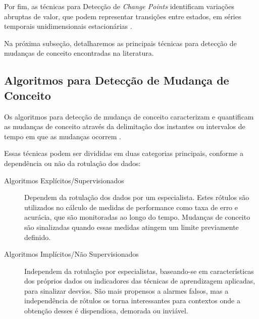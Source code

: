 \documentclass[qual, classic, a4paper]{ufbathesis}
\begin{document}

Por fim, as técnicas para Detecção de \textit{Change Points} identificam variações abruptas de valor, que podem representar transições entre estados, em séries temporais unidimensionais estacionárias \cite{Aminikhanghahi:2017:SMT:3086013.3086037}.

Na próxima subseção, detalharemos as principais técnicas para detecção de mudanças de conceito encontradas na literatura.

\subsection{Algoritmos para Detecção de Mudança de Conceito}

Os algoritmos para detecção de mudança de conceito caracterizam e quantificam as mudanças de conceito através da delimitação dos instantes ou intervalos de tempo em que as mudanças ocorrem \cite{Basseville:1993:DAC:151741}.

Essas técnicas podem ser divididas em duas categorias principais, conforme a dependência ou não da rotulação dos dados:
\begin{description}
    \item[Algoritmos Explícitos/Supervisionados] Dependem da rotulação dos dados por um especialista.
    Estes rótulos são utilizados no cálculo de medidas de performance como taxa de erro e acurácia, que são monitoradas ao longo do tempo.
    Mudanças de conceito são sinalizadas quando essas medidas atingem um limite previamente definido.

    \item[Algoritmos Implícitos/Não Supervisionados] Independem da rotulação por especialistas, 
    baseando-se em características dos próprios dados ou indicadores das técnicas de aprendizagem aplicadas, para sinalizar desvios.
    São mais propensos a alarmes falsos, mas a independência de rótulos os torna interessantes para contextos onde a obtenção desses é dispendiosa, demorada ou inviável.
\end{description}
\end{document}
